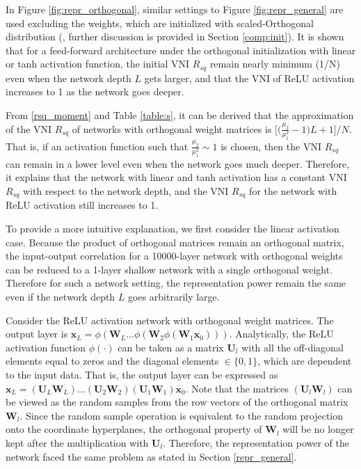 In Figure \ref{fig:repr_orthogonal}, similar settings to Figure \ref{fig:repr_general} are 
used excluding the weights, which are initialized with scaled-Orthogonal distribution
(\cite{mft:linear}, further discussion is provided in Section \ref{comp:init}). It is shown
that for a feed-forward architecture under the orthogonal initialization with linear or tanh
activation function, the initial VNI $R_{sq}$ remain nearly
minimum (1/N) even when the network depth $L$ gets larger, and that the VNI of ReLU
activation increases to 1 as the network goes deeper.

From \eqref{rsq_moment} and Table \ref{table:s}, it can be derived that the approximation of
the VNI $R_{sq}$ of networks with orthogonal weight matrices is 
$\Big[\Big(\frac{\mu_2}{\mu_1^2}-1\Big)L+1\Big]\Big/N$. That is, if an activation function
such that $\frac{\mu_2}{\mu_1^2}\sim1$ is chosen, then the VNI $R_{sq}$ can remain
in a lower level even when the network goes much deeper. Therefore, it explains that the 
network with linear and tanh activation has a constant VNI $R_{sq}$ with respect to the
network depth, and the VNI $R_{sq}$ for the network with ReLU activation still increases
to 1.

To provide a more intuitive explanation, we first consider the linear activation case.
Because the product of orthogonal matrices remain an orthogonal matrix, the input-output
correlation for a 10000-layer network with orthogonal weights can be reduced to a 1-layer
shallow network with a single orthogonal weight. Therefore for such a network setting, the
representation power remain the same even if the network depth $L$ goes arbitrarily large.

Consider the ReLU activation network with orthogonal weight matrices. The output layer is
$\mathbf{x}_L=\phi(\mathbf{W}_L\dots\phi(\mathbf{W}_2\phi(\mathbf{W}_1\mathbf{x}_0)))$.
Analytically, the ReLU activation function $\phi(\cdot)$ can be taken as a matrix
$\mathbf{U}_l$ with all the off-diagonal elements equal to zeros and the diagonal elements
$\in\{0, 1\}$, which are dependent to the input data. That is, the output layer can be
expressed as
$\mathbf{x}_L=(\mathbf{U}_L\mathbf{W}_L)\dots(\mathbf{U}_2\mathbf{W}_2)(\mathbf{U}_1\mathbf{W}_1)\mathbf{x}_0$.
Note that the matrices $(\mathbf{U}_l\mathbf{W}_l)$ can be viewed as the random samples
from the row vectors of the orthogonal matrix $\mathbf{W}_l$.
Since the random sample operation is equivalent to the random projection onto the coordinate
hyperplanes, the orthogonal property of $\mathbf{W}_l$ will be no longer kept after the
multiplication with $\mathbf{U}_l$.
Therefore, the representation power of the network faced the same problem as stated in
Section \ref{repr_general}.


